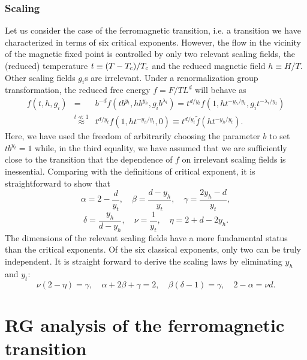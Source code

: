 \subsubsection{Scaling}
Let us consider the case of the ferromagnetic transition, i.e. a transition we have characterized in terms of six critical exponents. 
However, the flow in the vicinity of the magnetic fixed point is controlled by only two relevant scaling fields, the (reduced) temperature $t \equiv (T-T_{\rm c})/T_{\rm c}$ and the reduced magnetic field $h \equiv H/T$. Other scaling fields $g_i$s are irrelevant.
Under a renormalization group transformation, the reduced free energy $f = F/TL^d$ will behave as
\begin{eqnarray}
f(t,h,g_i) &=& b^{-d}f(tb^{y_t}, hb^{y_h},g_ib^{\lambda_i}) = t^{d/y_t} f(1,ht^{-y_h/y_t},g_it^{-\lambda_i/y_t}) \nonumber \\ 
&\overset{t\ll1}{\approx}& t^{d/y_t} f(1,ht^{-y_h/y_t},0) \equiv t^{d/y_t}\tilde{f}(ht^{-y_h/y_t}) .\nonumber \end{eqnarray}
Here, we have used the freedom of arbitrarily choosing the parameter $b$ to set $tb^{y_t} = 1$ while, in the third equality, we have assumed that we are sufficiently close to the transition that the dependence of $f$ on irrelevant scaling fields is inessential.
Comparing with the definitions of critical exponent, it is straightforward to show that
\[\alpha = 2 - \frac{d}{y_t} , \quad \beta = \frac{d-y_h}{y_t} , \quad \gamma = \frac{2y_h-d}{y_t} ,\]
\[\delta = \frac{y_h}{d - y_h} , \quad \nu = \frac{1}{y_t} , \quad \eta = 2 + d - 2y_h.\]
The dimensions of the relevant scaling fields have a more fundamental status than the critical exponents.
Of the six classical exponents, only two can be truly
independent. It is straight forward to derive the scaling laws by eliminating $y_h$ and $y_t$:
\[\nu(2-\eta) = \gamma , \quad \alpha + 2\beta + \gamma = 2 , \quad \beta(\delta - 1) = \gamma , \quad 2 - \alpha = \nu d.\]

\section{RG analysis of the ferromagnetic transition}
